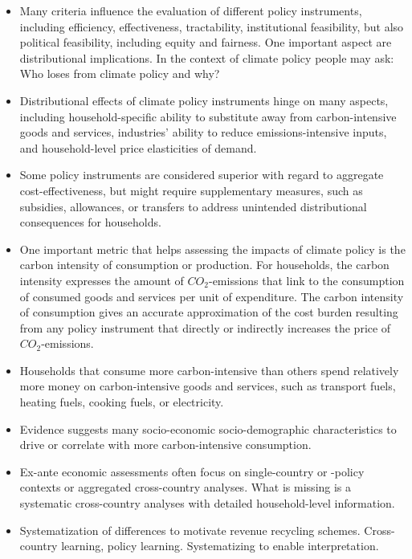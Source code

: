 \documentclass[12pt, a4paper]{article}
\begin{document}
\begin{itemize}
    
  \item Many criteria influence the evaluation of different policy instruments, including efficiency, effectiveness, tractability, institutional feasibility, but also political feasibility, including equity and fairness. One important aspect are distributional implications. In the context of climate policy people may ask: Who loses from climate policy and why?
  \item Distributional effects of climate policy instruments hinge on many aspects, including household-specific ability to substitute away from carbon-intensive goods and services, industries' ability to reduce emissions-intensive inputs, and household-level price elasticities of demand.
  \item Some policy instruments are considered superior with regard to aggregate cost-effectiveness, but might require supplementary measures, such as subsidies, allowances, or transfers to address unintended distributional consequences for households.
  \item One important metric that helps assessing the impacts of climate policy is the carbon intensity of consumption or production. For households, the carbon intensity expresses the amount of $CO_{2}$-emissions that link to the consumption of consumed goods and services per unit of expenditure. The carbon intensity of consumption gives an accurate approximation of the cost burden resulting from any policy instrument that directly or indirectly increases the price of $CO_{2}$-emissions.
  \item Households that consume more carbon-intensive than others spend relatively more money on carbon-intensive goods and services, such as transport fuels, heating fuels, cooking fuels, or electricity.
  \item Evidence suggests many socio-economic socio-demographic characteristics to drive or correlate with more carbon-intensive consumption.
  \item Ex-ante economic assessments often focus on single-country or -policy contexts or aggregated cross-country analyses. What is missing is a systematic cross-country analyses with detailed household-level information.
  \item Systematization of differences to motivate revenue recycling schemes. Cross-country learning, policy learning. Systematizing to enable interpretation.
\end{itemize}
\end{document}
